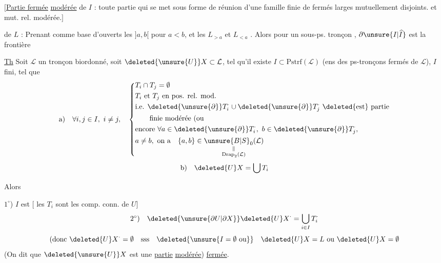 $\bigl[$\uline{Partie fermée} \uline{modérée} de $I$ : toute partie qui se met sous forme de réunion d'une famille finie de  fermés larges mutuellement disjoints. et mut.  rel. modérée.$\bigr]$

 de $L$  : Prenant comme base d'ouverts les  $]a,b[$ pour $a<b$, et les $L_{>a}$ et $L_{<a}$ \unsure{(}. Alors  pour un sous-ps. tronçon , $\partial\unsure{I|\widehat I}$ est la frontière
\margin{\uline{NB} Il n'y a pas besoin d'introduire les $L_{>a}$ \unsure{et} si $L$ \unsure{n'a} pas de plus grand élément, et itou pour $L_{<a}$ si \unsure{$a$|$L$} n'a pas de \unsure{plus} petit élément. \unsure{Dans ce cas|Dans} \illegible{2} $]a,b[$.}

\uline{Th} Soit $\mathcal L$ un tronçon biordonné, soit $\deleted{\unsure{U}}X\subset\mathcal L$, tel qu'il existe $I\subset\mathrm{Pstrf}(\mathcal L)$ (ens des ps-tronçons fermés de $\mathcal L$), $I$ fini,  tel que
\[
\begin{aligned}
\text{a)}\quad \forall i,j\in I,\ i\ne j,\quad
\left\{\begin{aligned}
&T_i\cap T_j=\emptyset\\
&T_i\text{ et }T_j\text{ en pos. rel. mod.}\\
&\text{i.e. }\deleted{\unsure{\partial}}T_i^{\cdot}\cup \deleted{\unsure{\partial}}T_j^{\cdot}\ \text{\deleted{est} partie}\\
&\qquad\text{finie modérée (ou}\\
&\text{encore }\forall a\in\deleted{\unsure{\partial}}T_i^{\cdot},\ b\in\deleted{\unsure{\partial}}T_j^{\cdot},\\
&a\ne b,\ \text{on a}\quad\{a,b\}\in\underset{\substack{\Vert\\\mathrm{Drap}_2(\mathcal L)}}{\unsure{B|S}_{0}(\mathcal L)}
\end{aligned}\right.
\end{aligned}
\]
\[
\text{b)}\quad \deleted{U}X=\bigcup T_i
\]

Alors

$1^\circ$) $I$ est  [ les $T_i$ sont les comp. conn. de $U$]
\[
\text{$2^\circ$)}\quad \deleted{\unsure{\partial U|\partial X}}\deleted{U}X^{\cdot}=\bigcup_{i\in I}T_i^{\cdot}
\]
\[
(\text{donc }\deleted{U}X^{\cdot}=\emptyset\quad\text{sss}\quad\deleted{\unsure{I=\emptyset\ \text{ou}}}\quad\deleted{U}X=L\text{ ou }\deleted{U}X=\emptyset
\]
(On dit que $\deleted{\unsure{U}}X$ est une \uline{partie} \uline{modérée}) \uline{fermée}.

